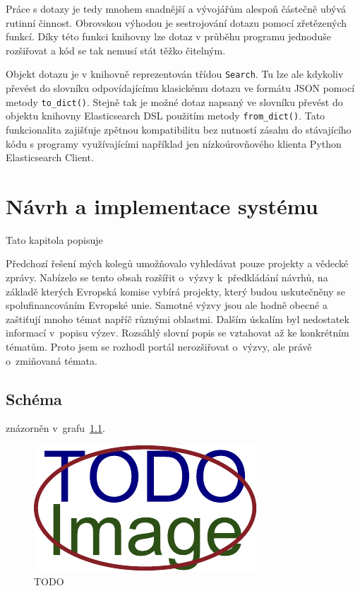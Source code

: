 Práce s dotazy je tedy mnohem snadnější a vývojářům alespoň částečně ubývá rutinní činnost. Obrovskou výhodou je sestrojování dotazu pomocí zřetězených funkcí. Díky této funkci knihovny lze dotaz v průběhu programu jednoduše rozšiřovat a kód se tak nemusí stát těžko čitelným.

Objekt dotazu je v knihovně reprezentován třídou \texttt{Search}. Tu lze ale kdykoliv převést do slovníku odpovídajícímu klasickému dotazu ve formátu JSON pomocí metody \texttt{to\_dict()}. Stejně tak je možné dotaz napsaný ve slovníku převést do objektu knihovny Elasticsearch DSL použitím metody \texttt{from\_dict()}. Tato funkcionalita zajišťuje zpětnou kompatibilitu bez nutností zásahu do stávajícího kódu s programy využívajícími například jen nízkoúrovňového klienta Python Elasticsearch Client.





\chapter{Návrh a implementace systému}
Tato kapitola popisuje \blindtext

Předchozí řešení mých kolegů umožňovalo vyhledávat pouze projekty a vědecké zprávy. Nabízelo se tento obsah rozšířit o~výzvy k~předkládání návrhů, na základě kterých Evropská komise vybírá projekty, který budou uskutečněny se spolufinancováním Evropské unie.
Samotné výzvy jsou ale hodně obecné a zaštiťují mnoho témat napříč různými oblastmi. Dalším úskalím byl nedostatek informací v~popisu výzev. Rozsáhlý slovní popis se vztahovat až ke konkrétním tématům. Proto jsem se rozhodl portál nerozšiřovat o~výzvy, ale právě o~zmiňovaná témata.

\section{Schéma}
\blindtext znázorněn v~grafu~\ref{img:scheme}.

\begin{figure}[H]
	\centering
	\includegraphics[width=\textwidth]{obrazky-figures/placeholder.pdf}
	\caption{TODO}
	\label{img:scheme}
\end{figure}

